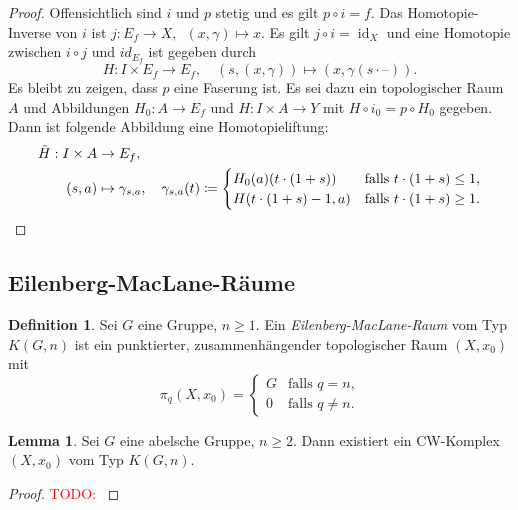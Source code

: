 \documentclass[11pt, a4paper, german]{article}
\theoremstyle{definition}
\newtheorem{lem}{Lemma}
\newtheorem{defn}{Definition}
\theoremstyle{remark}
\newcommand{\TODO}[1]{\textcolor{red}{TODO: #1}} %
\DeclareMathOperator{\id}{id} %
\newcommand{\blank}{\text{--}} %
\newcommand{\I}{I} %
\begin{document}
\begin{proof}
  Offensichtlich sind $i$ und $p$ stetig und es gilt $p \circ i = f$.
  Das Homotopie-Inverse von $i$ ist $j : E_f \to X, \enspace (x, \gamma) \mapsto x$.
  Es gilt $j \circ i = \id_X$ und eine Homotopie zwischen $i \circ j$ und $id_{E_f}$ ist gegeben durch
  \[
    H : \I \times E_f \to E_f, \quad
    (s, (x, \gamma)) \mapsto (x, \gamma(s \cdot \blank)).
  \]
  Es bleibt zu zeigen, dass $p$ eine Faserung ist.
  Es sei dazu ein topologischer Raum $A$ und Abbildungen $H_0 : A \to E_f$ und $H : \I \times A \to Y$ mit $H \circ i_0 = p \circ H_0$ gegeben.
  Dann ist folgende Abbildung eine Homotopieliftung:
  \begin{align*}
    \tilde{H} : \I \times A & \to E_f, \\
    (s, a) & \mapsto \gamma_{s, a}, \quad
    \gamma_{s, a}(t) \coloneqq \begin{cases}
      H_0(a)(t \cdot (1+s)) & \text{falls $t \cdot (1+s) \leq 1$,} \\
      H(t \cdot (1+s) - 1, a) & \text{falls $t \cdot (1+s) \geq 1$.}
      \qedhere
    \end{cases}
  \end{align*}
\end{proof}

\subsection{Eilenberg-MacLane-Räume}

\begin{defn}
  Sei $G$ eine Gruppe, $n \geq 1$.
  Ein \emph{Eilenberg-MacLane-Raum} vom Typ $K(G, n)$ ist ein punktierter, zusammenhängender topologischer Raum $(X, x_0)$ mit
  \[
    \pi_q(X, x_0) = \begin{cases}
      G & \text{falls $q = n$,} \\
      0 & \text{falls $q \neq n$.}
    \end{cases}
  \]
\end{defn}

\begin{lem}
  Sei $G$ eine abelsche Gruppe, $n \geq 2$.
  Dann existiert ein CW-Komplex $(X, x_0)$ vom Typ $K(G, n)$.
\end{lem}

\begin{proof}
  \TODO{}
\end{proof}
\end{document}
